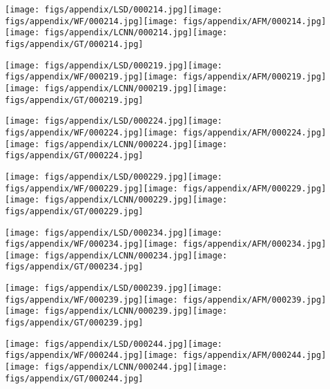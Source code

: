 \documentclass[10pt,twocolumn,letterpaper]{article}
\begin{document}
\texttt{[image: figs/appendix/LSD/000214.jpg]}\texttt{[image: figs/appendix/WF/000214.jpg]}\texttt{[image: figs/appendix/AFM/000214.jpg]}\texttt{[image: figs/appendix/LCNN/000214.jpg]}\texttt{[image: figs/appendix/GT/000214.jpg]}

\texttt{[image: figs/appendix/LSD/000219.jpg]}\texttt{[image: figs/appendix/WF/000219.jpg]}\texttt{[image: figs/appendix/AFM/000219.jpg]}\texttt{[image: figs/appendix/LCNN/000219.jpg]}\texttt{[image: figs/appendix/GT/000219.jpg]}

\texttt{[image: figs/appendix/LSD/000224.jpg]}\texttt{[image: figs/appendix/WF/000224.jpg]}\texttt{[image: figs/appendix/AFM/000224.jpg]}\texttt{[image: figs/appendix/LCNN/000224.jpg]}\texttt{[image: figs/appendix/GT/000224.jpg]}

\texttt{[image: figs/appendix/LSD/000229.jpg]}\texttt{[image: figs/appendix/WF/000229.jpg]}\texttt{[image: figs/appendix/AFM/000229.jpg]}\texttt{[image: figs/appendix/LCNN/000229.jpg]}\texttt{[image: figs/appendix/GT/000229.jpg]}

\texttt{[image: figs/appendix/LSD/000234.jpg]}\texttt{[image: figs/appendix/WF/000234.jpg]}\texttt{[image: figs/appendix/AFM/000234.jpg]}\texttt{[image: figs/appendix/LCNN/000234.jpg]}\texttt{[image: figs/appendix/GT/000234.jpg]}

\texttt{[image: figs/appendix/LSD/000239.jpg]}\texttt{[image: figs/appendix/WF/000239.jpg]}\texttt{[image: figs/appendix/AFM/000239.jpg]}\texttt{[image: figs/appendix/LCNN/000239.jpg]}\texttt{[image: figs/appendix/GT/000239.jpg]}

\texttt{[image: figs/appendix/LSD/000244.jpg]}\texttt{[image: figs/appendix/WF/000244.jpg]}\texttt{[image: figs/appendix/AFM/000244.jpg]}\texttt{[image: figs/appendix/LCNN/000244.jpg]}\texttt{[image: figs/appendix/GT/000244.jpg]}
\end{document}
